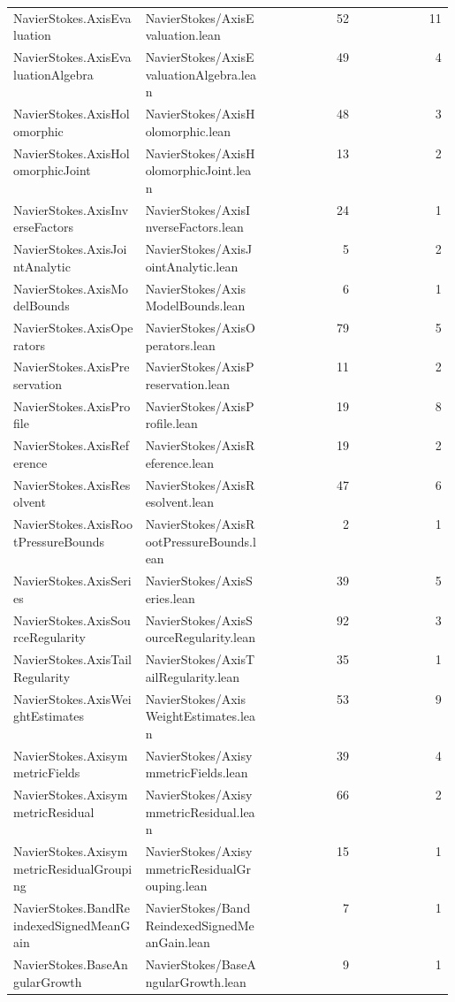 \begin{longtable}{p{0.30\linewidth}p{0.28\linewidth}rr}
NavierStokes.AxisEvaluation & NavierStokes/AxisEvaluation.lean & 52 & 11\\
NavierStokes.AxisEvaluationAlgebra & NavierStokes/AxisEvaluationAlgebra.lean & 49 & 4\\
NavierStokes.AxisHolomorphic & NavierStokes/AxisHolomorphic.lean & 48 & 3\\
NavierStokes.AxisHolomorphicJoint & NavierStokes/AxisHolomorphicJoint.lean & 13 & 2\\
NavierStokes.AxisInverseFactors & NavierStokes/AxisInverseFactors.lean & 24 & 1\\
NavierStokes.AxisJointAnalytic & NavierStokes/AxisJointAnalytic.lean & 5 & 2\\
NavierStokes.AxisModelBounds & NavierStokes/AxisModelBounds.lean & 6 & 1\\
NavierStokes.AxisOperators & NavierStokes/AxisOperators.lean & 79 & 5\\
NavierStokes.AxisPreservation & NavierStokes/AxisPreservation.lean & 11 & 2\\
NavierStokes.AxisProfile & NavierStokes/AxisProfile.lean & 19 & 8\\
NavierStokes.AxisReference & NavierStokes/AxisReference.lean & 19 & 2\\
NavierStokes.AxisResolvent & NavierStokes/AxisResolvent.lean & 47 & 6\\
NavierStokes.AxisRootPressureBounds & NavierStokes/AxisRootPressureBounds.lean & 2 & 1\\
NavierStokes.AxisSeries & NavierStokes/AxisSeries.lean & 39 & 5\\
NavierStokes.AxisSourceRegularity & NavierStokes/AxisSourceRegularity.lean & 92 & 3\\
NavierStokes.AxisTailRegularity & NavierStokes/AxisTailRegularity.lean & 35 & 1\\
NavierStokes.AxisWeightEstimates & NavierStokes/AxisWeightEstimates.lean & 53 & 9\\
NavierStokes.AxisymmetricFields & NavierStokes/AxisymmetricFields.lean & 39 & 4\\
NavierStokes.AxisymmetricResidual & NavierStokes/AxisymmetricResidual.lean & 66 & 2\\
NavierStokes.AxisymmetricResidualGrouping & NavierStokes/AxisymmetricResidualGrouping.lean & 15 & 1\\
NavierStokes.BandReindexedSignedMeanGain & NavierStokes/BandReindexedSignedMeanGain.lean & 7 & 1\\
NavierStokes.BaseAngularGrowth & NavierStokes/BaseAngularGrowth.lean & 9 & 1\\

\end{longtable}

